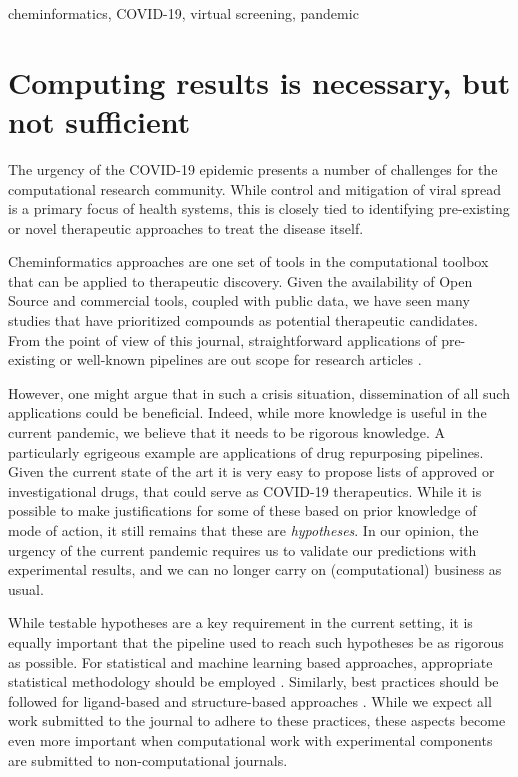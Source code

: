 \documentclass{bmcart}
\begin{document}
\begin{frontmatter}
\begin{abstractbox}
\begin{abstract}
\end{abstract}
\begin{keyword}
  cheminformatics, COVID-19, virtual screening, pandemic
\end{keyword}
\end{abstractbox}

%

\end{frontmatter}



\section*{Computing results is necessary, but not sufficient}

The urgency of the COVID-19 epidemic presents a number of challenges
for the computational research community. While control and mitigation
of viral spread is a primary focus of health systems, this is closely
tied to identifying pre-existing or novel therapeutic approaches to
treat the disease itself. 

Cheminformatics approaches are one set of tools in the computational
toolbox that can be applied to therapeutic discovery. Given the
availability of Open Source and commercial tools, coupled with public
data, we have seen many studies that have prioritized compounds as
potential therapeutic candidates. From the point of view of this
journal, straightforward applications of pre-existing or well-known
pipelines are out scope for research articles \cite{jcheminf_scope}.

However, one might argue that in such a crisis situation,
dissemination of all such applications could be beneficial. Indeed,
while more knowledge is useful in the current pandemic, we believe
that it needs to be rigorous knowledge. A particularly egrigeous
example are applications of drug repurposing pipelines. Given the
current state of the art it is very easy to propose lists of approved
or investigational drugs, that could serve as COVID-19
therapeutics. While it is possible to make justifications for some of
these based on prior knowledge of mode of action, it still remains
that these are \emph{hypotheses}. In our opinion, the urgency of the
current pandemic requires us to validate our predictions with
experimental results, and we can no longer carry on (computational)
business as usual.

While testable hypotheses are a key requirement in the current
setting, it is equally important that the pipeline used to reach such
hypotheses be as rigorous as possible. For statistical and machine
learning based approaches, appropriate statistical methodology should
be employed \cite{cc_stats_1,cc_stats_2, cc_stats_3}. Similarly, best
practices should be followed for ligand-based \cite{qsar_1, qsar_2}
and structure-based approaches \cite{sbdd_1, sbdd_2}. While we expect
all work submitted to the journal to adhere to these practices, these aspects
become even more important when computational work with experimental
components are submitted to non-computational journals.
\end{document}
